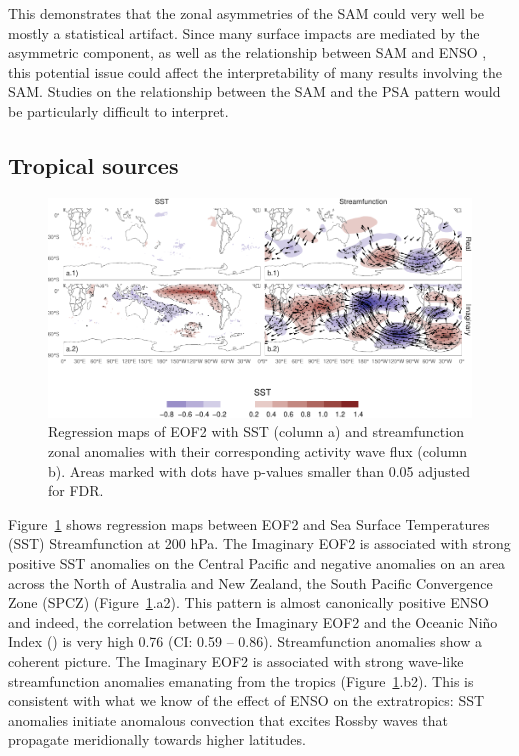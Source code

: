 \documentclass[smallextended]{svjour3}       %
\begin{document}
This demonstrates that the zonal asymmetries of the SAM could very well be mostly a statistical artifact. Since many surface impacts are mediated by the asymmetric component, as well as the relationship between SAM and ENSO \citep{campitelli2021}, this potential issue could affect the interpretability of many results involving the SAM. Studies on the relationship between the SAM and the PSA pattern would be particularly difficult to interpret.

\hypertarget{tropical-sources}{%
\subsection{Tropical sources}\label{tropical-sources}}



\begin{figure}
\includegraphics{../figures/sst-psi-2-1} \caption{Regression maps of EOF2 with SST (column a) and streamfunction zonal anomalies with their corresponding activity wave flux (column b). Areas marked with dots have p-values smaller than 0.05 adjusted for FDR.}\label{fig:sst-psi-2}
\end{figure}

Figure~\ref{fig:sst-psi-2} shows regression maps between EOF2 and Sea Surface Temperatures (SST) Streamfunction at 200 hPa. The Imaginary EOF2 is associated with strong positive SST anomalies on the Central Pacific and negative anomalies on an area across the North of Australia and New Zealand, the South Pacific Convergence Zone (SPCZ) (Figure~\ref{fig:sst-psi-2}.a2). This pattern is almost canonically positive ENSO and indeed, the correlation between the Imaginary EOF2 and the Oceanic Niño Index (\citep{bamston1997}) is very high 0.76 (CI: 0.59 -- 0.86). Streamfunction anomalies show a coherent picture. The Imaginary EOF2 is associated with strong wave-like streamfunction anomalies emanating from the tropics (Figure~\ref{fig:sst-psi-2}.b2). This is consistent with what we know of the effect of ENSO on the extratropics: SST anomalies initiate anomalous convection that excites Rossby waves that propagate meridionally towards higher latitudes.
\end{document}
